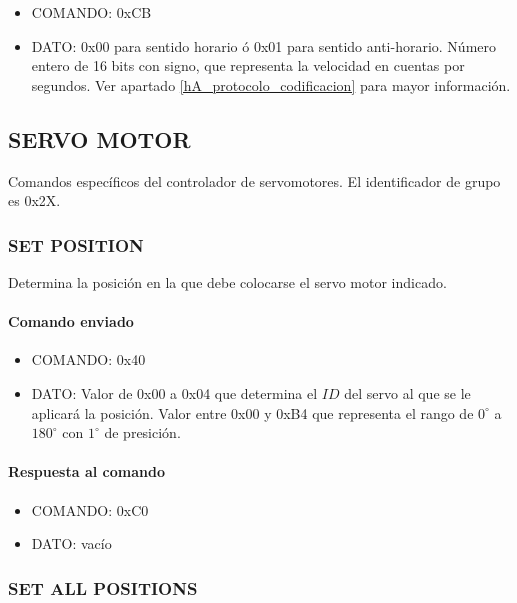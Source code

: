 \begin{itemize}
	\item{COMANDO:} 0xCB
	\item{DATO:} 0x00 para sentido horario \'o 0x01 para sentido anti-horario.
		N\'umero entero de 16 bits con signo, que representa la velocidad en cuentas por segundos.
		Ver apartado \ref{hA_protocolo_codificacion} para mayor informaci\'on.
\end{itemize}

\subsection{SERVO MOTOR}
\label{hA_protocolo_grupo_servo_motor}

Comandos espec\'ificos del controlador de servomotores.
El identificador de grupo es 0x2X.

\subsubsection{SET POSITION}
\label{hA_protocolo_set_position}

Determina la posici\'on en la que debe colocarse el servo motor indicado.

\paragraph*{Comando enviado}

\begin{itemize}
	\item{COMANDO:} 0x40
	\item{DATO:} Valor de 0x00 a 0x04 que determina el $ID$ del servo al que se le aplicar\'a la posici\'on.
	Valor entre 0x00 y 0xB4 que representa el rango de $0^{\circ}$ a $180^{\circ}$ con $1^{\circ}$ de presici\'on.
\end{itemize}

\paragraph*{Respuesta al comando}

\begin{itemize}
	\item{COMANDO:} 0xC0
	\item{DATO:} vac\'io
\end{itemize}

\subsubsection{SET ALL POSITIONS}
\label{hA_protocolo_set_all_positions}

